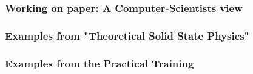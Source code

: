 \begin{frame}
    \frametitle{Working on paper: A Computer-Scientists view}
\end{frame}

\begin{frame}
    \frametitle{Examples from "Theoretical Solid State Physics"}
\end{frame}

\begin{frame}
    \frametitle{Examples from the Practical Training}
\end{frame}